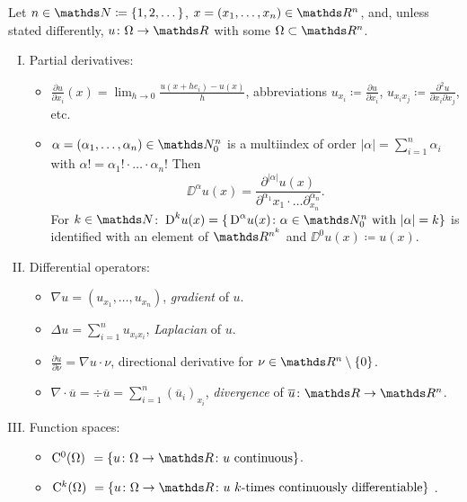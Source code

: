 \newpage
\begin{ntion}
  Let $n \in \N \coloneqq \{1,2,\dots\}$, $x  = (x_1,\dots, x_n) \in \R^n$, and, unless stated differently, $u \colon \Omega \to \R$ with some $\Omega \subset \R^n$.
  \begin{enumerate}[I)]
    \item Partial derivatives:
      \begin{itemize}
        \item $\frac{\partial u}{\partial x_i}(x) = \lim_{h \to 0} \frac{u(x + he_i) - u(x)}{h}$, abbreviations $u_{x_i} \coloneqq \frac{\partial u}{\partial x_i}$, $u_{x_i x_j} \coloneqq \frac{\partial^2 u}{\partial x_i \partial x_j}$, etc.
        \item $\alpha = (\alpha_1,\dots,\alpha_n) \in \N_0^n$ is a multiindex of order $|\alpha| = \sum_{i = 1}^n \alpha_i$ with $\alpha! = \alpha_1! \cdot\ldots\cdot\alpha_n!$
          Then
          $$
          \DD^\alpha u(x) = \frac{\partial^|\alpha| u(x)}{\partial^{\alpha_1} x_1 \cdot \ldots \partial^{\alpha_n}_{x_n}}.
          $$
          For $k \in \N$: $\DD^k u(x) = \{\DD^\alpha u(x) \colon \alpha \in \N_0^n \text{ with } |\alpha| = k \}$ is identified with an element of $\R^{n^k}$ and $\DD^0 u(x) \coloneqq u(x)$.
      \end{itemize}

    \item Differential operators:
      \begin{itemize}
        \item $\nabla u = (u_{x_1}, \dots, u_{x_n})$, \emph{gradient} of $u$.
        \item $\Delta u = \sum_{i = 1}^n u_{x_i x_i}$, \emph{Laplacian} of $u$.
        \item $\frac{\partial u}{\partial \nu} = \nabla u \cdot \nu$, directional derivative for $\nu \in \R^n \setminus\{0\}$.
        \item $\nabla \cdot \overline u = \div \overline u = \sum_{i = 1}^n (\overline u_i)_{x_i}$, \emph{divergence} of $\overline u \colon \R \to \R^n$.
      \end{itemize}


    \item Function spaces:
      \begin{itemize}
        \item $\CC^0(\Omega)
          \nicestspace 
          = \{u \colon \Omega \to \R \colon u \text{ continuous}\}$.
        \item $\CC^k(\Omega)
          \nicerspace 
          = \{u \colon \Omega \to \R \colon u \text{ $k$-times continuously differentiable}\}$ .
          

\end{itemize}
\end{enumerate}
\end{ntion}
